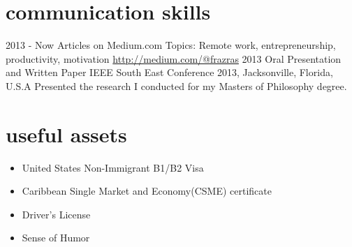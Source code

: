 \documentclass[]{friggeri-cv} %
\begin{document}


\newpage
\section{communication skills}

\begin{entrylist}

\entry
{2013 - Now}
{Articles on Medium.com}
{Topics: Remote work, entrepreneurship, productivity, motivation}
{\href{http://medium.com/@frazras}{http://medium.com/@frazras}}
\entry
{2013}
{Oral Presentation and Written Paper}
{IEEE South East Conference 2013, Jacksonville, Florida, U.S.A}
{Presented the research I conducted for my Masters of Philosophy degree.}
\end{entrylist}


\section{useful assets}
\begin{itemize}
	\item United States Non-Immigrant B1/B2 Visa
    \item Caribbean Single Market and Economy(CSME) certificate
    \item Driver's License
    \item Sense of Humor
\end{itemize}
\end{document}
